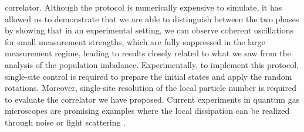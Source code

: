 correlator. Although the protocol is numerically expensive to simulate, it has allowed us to demonstrate that we are able to distinguish between the two phases by showing that in an experimental setting, we can observe coherent oscillations for small measurement strengths, which are fully suppressed in the large measurement regime, leading to results closely related to what we saw from the analysis of the population imbalance. Experimentally, to implement this protocol, single-site control is required to prepare the initial states and apply the random rotations. Moreover, single-site resolution of the local particle number is required to evaluate the correlator we have proposed. Current experiments in quantum gas microscopes \cite{bakr2009, blatt2012, gross2017, gross2021} are promising examples where the local dissipation can be realized through noise or light scattering \cite{pichler2010, luschen2017, poletti2013, sarkar2014}. 